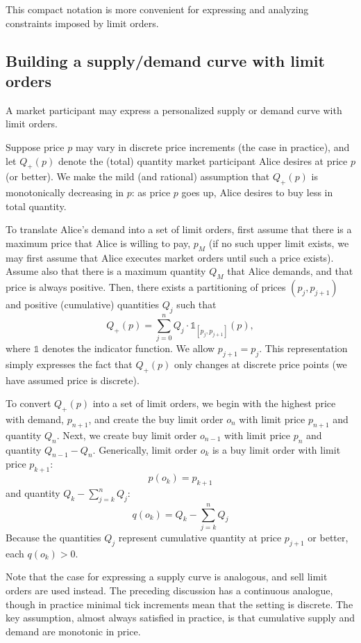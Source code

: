 \documentclass[11pt, reqno]{amsart}
\theoremstyle{definition}
\theoremstyle{remark}
\begin{document}
This compact notation is more convenient for expressing and analyzing
constraints imposed by limit orders.

\subsection{Building a supply/demand curve with limit orders}

A market participant may express a personalized supply or demand curve with
limit orders.

Suppose price $p$ may vary in discrete price increments (the case in practice),
and let $Q_+(p)$ denote the (total) quantity market participant Alice desires
at price $p$ (or better).  We make the mild (and rational) assumption that
$Q_+(p)$ is monotonically decreasing in $p$: as price $p$ goes up, Alice desires
to buy less in total quantity.

To translate Alice's demand into a set of limit orders, first assume that there
is a maximum price that Alice is willing to pay, $p_M$ (if no such upper limit
exists, we may first assume that Alice executes market orders until such a
price exists). Assume also that there is a maximum quantity $Q_M$ that Alice
demands, and that price is always positive. Then, there exists a partitioning
of prices $(p_j, p_{j + 1})$ and positive (cumulative) quantities $Q_j$ such
that
\[
    Q_+(p) = \sum_{j = 0}^n Q_j \cdot \mathbb{1}_{[p_j, p_{j + 1}]}(p),
\]
where $\mathbb{1}$ denotes the indicator function. We allow $p_{j + 1} = p_j$.
This representation simply expresses the fact that $Q_+(p)$ only changes at
discrete price points (we have assumed price is discrete).

To convert $Q_+(p)$ into a set of limit orders, we begin with the highest price
with demand, $p_{n + 1}$, and create the buy limit order $o_n$ with limit price
$p_{n + 1}$ and quantity $Q_n$. Next, we create buy limit order $o_{n - 1}$ with
limit price $p_n$ and quantity $Q_{n - 1} - Q_n$. Generically, limit order
$o_k$ is a buy limit order with limit price $p_{k + 1}$:
\[
    p(o_k) = p_{k + 1}
\]
and quantity $Q_k - \sum_{j = k}^n Q_j$:
\[
    q(o_k) = Q_k - \sum_{j = k}^n Q_j
\]
Because the quantities $Q_j$ represent cumulative quantity at price
$p_{j + 1}$ or better, each $q(o_k) > 0$.

Note that the case for expressing a supply curve is analogous, and sell limit
orders are used instead. The preceding discussion has a continuous analogue,
though in practice minimal tick increments mean that the setting is discrete.
The key assumption, almost always satisfied in practice, is that cumulative
supply and demand are monotonic in price.
\end{document}
